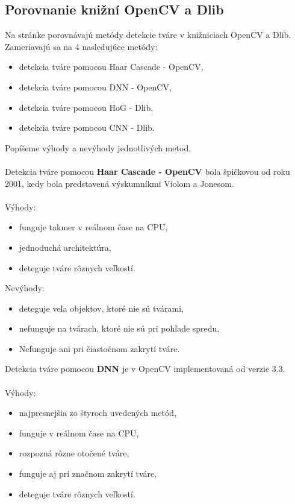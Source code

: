 \subsection{Porovnanie knižní OpenCV a Dlib} \label{OpenCVvsDlibNadpis}
Na stránke \cite{OpenCVvsDlib} porovnávajú metódy detekcie tváre v knižniciach OpenCV a Dlib. 
Zameriavajú sa na 4 nasledujúce metódy:
\begin{itemize}
	\item detekcia tváre pomocou Haar Cascade - OpenCV,
	\item detekcia tváre pomocou DNN - OpenCV,
	\item detekcia tváre pomocou HoG - Dlib,
	\item detekcia tváre pomocou CNN - Dlib.\\
\end{itemize}
Popíšeme výhody a nevýhody jednotlivých metod.\\
\\Detekcia tváre pomocou \textbf{Haar Cascade - OpenCV} bola špičkovou od roku 2001, kedy bola predstavená výskumníkmi Violom a Jonesom.\\
\\Výhody:
\begin{itemize}
	\item funguje takmer v reálnom čase na CPU,
	\item jednoduchá architektúra,
	\item deteguje tváre rôznych veľkostí.
\end{itemize}
Nevýhody:
\begin{itemize}
	\item deteguje veľa objektov, ktoré nie sú tvárami,
	\item nefunguje na tvárach, ktoré nie sú pri pohľade spredu,
	\item Nefunguje ani pri čiastočnom zakrytí tváre.\\
\end{itemize}
Detekcia tváre pomocou \textbf{DNN} je v OpenCV implementovaná od verzie 3.3. \\
\\Výhody:
\begin{itemize}
	\item najpresnejšia zo štyroch uvedených metód,
	\item funguje v reálnom čase na CPU,
	\item rozpozná rôzne otočené tváre,
	\item funguje aj pri značnom zakrytí tváre,
	\item deteguje tváre rôznych veľkostí.
\end{itemize}
